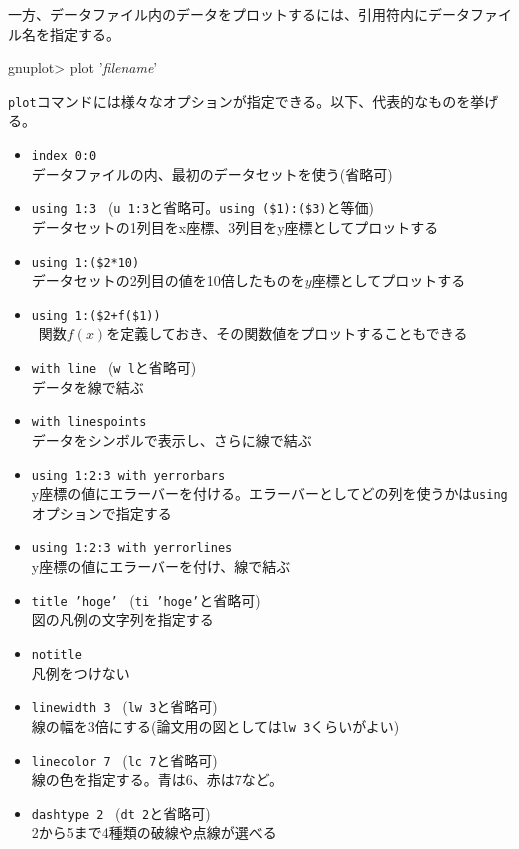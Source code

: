 {一方、データファイル内のデータをプロットするには、引用符内にデータファイル名を指定する。
\begin{commandline2}
gnuplot> plot '{\it filename}'
\end{commandline2} \noindent
{\tt plot}コマンドには様々なオプションが指定できる。以下、代表的なものを挙げる。
\begin{itemize}
\item {\tt index 0:0} \\
  データファイルの内、最初のデータセットを使う(省略可)
\item {\tt using 1:3} \ ({\tt u 1:3}と省略可。{\tt using (\$1):(\$3)}と等価) \\
  データセットの1列目をx座標、3列目をy座標としてプロットする
\item {\tt using 1:(\$2*10)} \\
  データセットの2列目の値を10倍したものを$y$座標としてプロットする  
\item {\tt using 1:(\$2+f(\$1))} \\\
  関数$f(x)$を定義しておき、その関数値をプロットすることもできる
\item {\tt with line} \ ({\tt w l}と省略可) \\
  データを線で結ぶ
\item {\tt with linespoints} \\
  データをシンボルで表示し、さらに線で結ぶ
\item {\tt using 1:2:3 with yerrorbars} \\
  y座標の値にエラーバーを付ける。エラーバーとしてどの列を使うかは{\tt using}オプションで指定する
\item {\tt using 1:2:3 with yerrorlines} \\
  y座標の値にエラーバーを付け、線で結ぶ
\item {\tt title 'hoge'} \ ({\tt ti 'hoge'}と省略可) \\
  図の凡例の文字列を指定する
\item {\tt notitle} \\
  凡例をつけない
\item {\tt linewidth 3} \ ({\tt lw 3}と省略可) \\
  線の幅を3倍にする(論文用の図としては{\tt lw 3}くらいがよい)
\item {\tt linecolor 7} \ ({\tt lc 7}と省略可) \\
  線の色を指定する。青は6、赤は7など。
\item {\tt dashtype 2} \ ({\tt dt 2}と省略可) \\
  2から5まで4種類の破線や点線が選べる

\end{itemize}}
